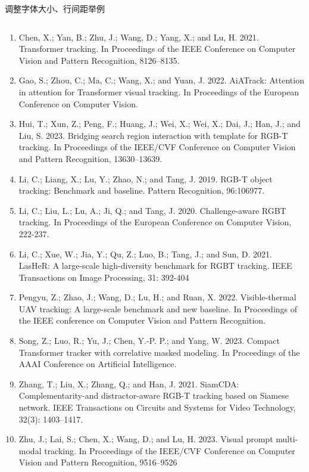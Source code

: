 \documentclass[aspectratio=169]{ahu-slide}
\begin{document}
\begin{frame}{调整字体大小、行间距举例}
\begin{columns}
    
\centering
    \begin{spacing}{0.5} %
    \begin{enumerate}
        \item {\tiny Chen, X.; Yan, B.; Zhu, J.; Wang, D.; Yang, X.; and Lu, H. 2021. Transformer tracking. In Proceedings of the IEEE Conference on Computer Vision and Pattern Recognition, 8126–8135.}
        \item {\tiny Gao, S.; Zhou, C.; Ma, C.; Wang, X.; and Yuan, J. 2022. AiATrack: Attention in attention for Transformer visual tracking. In Proceedings of the European Conference on Computer Vision.}
        \item {\tiny Hui, T.; Xun, Z.; Peng, F.; Huang, J.; Wei, X.; Wei, X.; Dai, J.; Han, J.; and Liu, S. 2023. Bridging search region interaction with template for RGB-T tracking. In Proceedings of the IEEE/CVF Conference on Computer Vision and Pattern Recognition, 13630–13639.}
        \item {\tiny Li, C.; Liang, X.; Lu, Y.; Zhao, N.; and Tang, J. 2019. RGB-T object tracking: Benchmark and baseline. Pattern Recognition, 96:106977.}
        \item {\tiny Li, C.; Liu, L.; Lu, A.; Ji, Q.; and Tang, J. 2020. Challenge-aware RGBT tracking. In Proceedings of the European Conference on Computer Vision, 222-237.}
        \item {\tiny Li, C.; Xue, W.; Jia, Y.; Qu, Z.; Luo, B.; Tang, J.; and Sun, D. 2021. LasHeR: A large-scale high-diversity benchmark for RGBT tracking. IEEE Transactions on Image Processing, 31: 392-404}
        \item {\tiny Pengyu, Z.; Zhao, J.; Wang, D.; Lu, H.; and Ruan, X. 2022. Visible-thermal UAV tracking: A large-scale benchmark and new baseline. In Proceedings of the IEEE conference on Computer Vision and Pattern Recognition.}
        \item {\tiny Song, Z.; Luo, R.; Yu, J.; Chen, Y.-P. P.; and Yang, W. 2023. Compact Transformer tracker with correlative masked modeling. In Proceedings of the AAAI Conference on Artificial Intelligence.}
        \item {\tiny Zhang, T.; Liu, X.; Zhang, Q.; and Han, J. 2021. SiamCDA: Complementarity-and distractor-aware RGB-T tracking based on Siamese network. IEEE Transactions on Circuits and Systems for Video Technology, 32(3): 1403–1417.}
        \item {\tiny Zhu, J.; Lai, S.; Chen, X.; Wang, D.; and Lu, H. 2023. Visual prompt multi-modal tracking. In Proceedings of the IEEE/CVF Conference on Computer Vision and Pattern Recognition, 9516–9526}
    \end{enumerate}
    \end{spacing}
    
\end{columns}
\end{frame}
\end{document}
